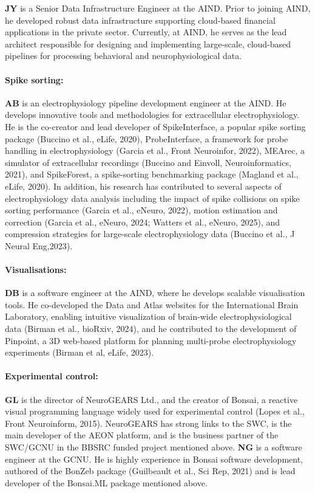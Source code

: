 \textbf{JY} is a Senior Data Infrastructure Engineer at the AIND.
%
Prior to joining AIND, he developed robust data infrastructure supporting
cloud-based financial applications in the private sector.
%
Currently, at AIND, he serves as the lead architect responsible for designing
and implementing large-scale, cloud-based pipelines for processing behavioral
and neurophysiological data.

\paragraph{Spike sorting:} \textbf{AB} is an electrophysiology pipeline
development engineer at the AIND. He develops innovative tools and methodologies
for extracellular electrophysiology.
%
He is the co-creator and lead developer of SpikeInterface, a popular spike
sorting package (Buccino et al., eLife, 2020), ProbeInterface, a framework for
probe handling in electrophysiology (Garcia et al., Front Neuroinfor, 2022),
MEArec, a simulator of extracellular recordings (Buccino and Einvoll,
Neuroinformatics, 2021), and SpikeForest, a spike-sorting benchmarking package
(Magland et al., eLife, 2020).
%
In addition, his research has contributed to several aspects of
electrophysiology data analysis including the impact of spike collisions on
spike sorting performance (Garcia et al., eNeuro, 2022), motion estimation and
correction (Garcia et al., eNeuro, 2024; Watters et al., eNeuro, 2025), and
compression strategies for large-scale electrophysiology data (Buccino et al.,
J Neural Eng,2023).

\paragraph{Visualisations:} \textbf{DB} is a software engineer at the AIND,
where he develops scalable visualisation tools.
%
He co-developed the Data and Atlas websites for the International Brain
Laboratory, enabling intuitive visualization of brain-wide electrophysiological
data (Birman et al., bioRxiv, 2024), and he contributed to the development of
Pinpoint, a 3D web-based platform for planning multi-probe electrophysiology
experiments (Birman et al, eLife, 2023).

\paragraph{Experimental control:} \textbf{GL} is the director of NeuroGEARS
Ltd., and the creator of Bonsai, a reactive visual programming language widely
used for experimental control (Lopes et al., Front Neuroinform, 2015).
NeuroGEARS has strong links to the SWC, is the main developer of the AEON
platform, and is the business partner of the SWC/GCNU in the BBSRC funded
project mentioned above.
%
\textbf{NG} is a software engineer at the GCNU. He is highly experience in
Bonsai software development, authored of the BonZeb package (Guilbeault et al.,
Sci Rep, 2021) and is lead developer of the Bonsai.ML package mentioned above.

